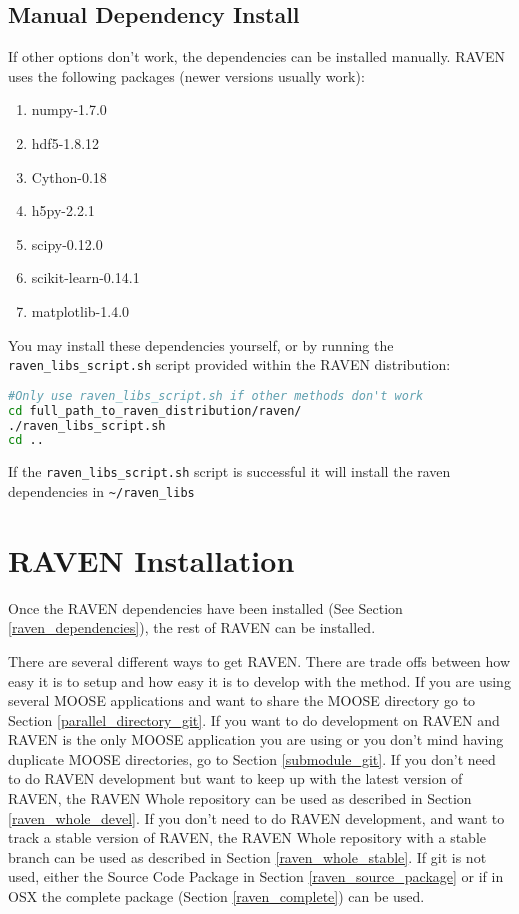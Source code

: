 \subsection{Manual Dependency Install}

If other options don't work, the dependencies can be installed
manually.  RAVEN uses the following packages (newer versions usually
work):

\begin{enumerate}
\item numpy-1.7.0
\item hdf5-1.8.12
\item Cython-0.18
\item h5py-2.2.1
\item scipy-0.12.0
\item scikit-learn-0.14.1
\item matplotlib-1.4.0
\end{enumerate}

You may install these dependencies yourself, or by running the
\texttt{raven\_libs\_script.sh} script provided within the RAVEN distribution:

\begin{lstlisting}[language=bash]
#Only use raven_libs_script.sh if other methods don't work
cd full_path_to_raven_distribution/raven/
./raven_libs_script.sh
cd ..
\end{lstlisting}

If the \texttt{raven\_libs\_script.sh} script is successful it will
install the raven dependencies in \verb'~/raven_libs'

\goToRavenInstallation

\section{RAVEN Installation}
\label{raven_installation}

Once the RAVEN dependencies have been installed (See Section
\ref{raven_dependencies}), the rest of RAVEN can be installed.

There are several different ways to get RAVEN.  There are trade offs
between how easy it is to setup and how easy it is to develop with the
method.  If you are using several MOOSE applications and want to share
the MOOSE directory go to Section \ref{parallel_directory_git}.  If
you want to do development on RAVEN and RAVEN is the only MOOSE
application you are using or you don't mind having duplicate MOOSE
directories, go to Section \ref{submodule_git}.  If you don't need to
do RAVEN development but want to keep up with the latest version of
RAVEN, the RAVEN Whole repository can be used as described in Section
\ref{raven_whole_devel}.  If you don't need to do RAVEN development,
and want to track a stable version of RAVEN, the RAVEN Whole
repository with a stable branch can be used as described in Section
\ref{raven_whole_stable}.  If git is not used, either the Source Code
Package in Section \ref{raven_source_package} or if in OSX the
complete package (Section \ref{raven_complete}) can be used.

